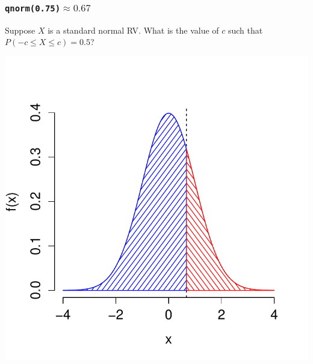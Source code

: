 \documentclass[handout]{beamer}
\begin{document}
\begin{frame}
\frametitle{\texttt{qnorm(0.75)}$\approx 0.67$}
Suppose $X$ is a standard normal RV. What is the value of $c$ such that $P(-c \leq X\leq c ) = 0.5$?
\begin{center}
\includegraphics[scale = 0.55]{./images/tail3}
\end{center}
\end{frame}

\end{document}
